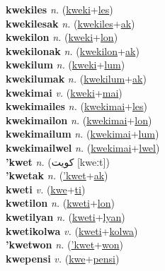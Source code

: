\textbf{kwekiles} \textit{n.} (\hyperref[kweki]{kweki}+\hyperref[les]{les})
 \label{kwekiles} \\
\textbf{kwekilesak} \textit{n.} (\hyperref[kwekiles]{kwekiles}+\hyperref[ak]{ak})
 \label{kwekilesak} \\
\textbf{kwekilon} \textit{n.} (\hyperref[kweki]{kweki}+\hyperref[lon]{lon})
 \label{kwekilon} \\
\textbf{kwekilonak} \textit{n.} (\hyperref[kwekilon]{kwekilon}+\hyperref[ak]{ak})
 \label{kwekilonak} \\
\textbf{kwekilum} \textit{n.} (\hyperref[kweki]{kweki}+\hyperref[lum]{lum})
 \label{kwekilum} \\
\textbf{kwekilumak} \textit{n.} (\hyperref[kwekilum]{kwekilum}+\hyperref[ak]{ak})
 \label{kwekilumak} \\
\textbf{kwekimai} \textit{v.} (\hyperref[kweki]{kweki}+\hyperref[mai]{mai})
 \label{kwekimai} \\
\textbf{kwekimailes} \textit{n.} (\hyperref[kwekimai]{kwekimai}+\hyperref[les]{les})
 \label{kwekimailes} \\
\textbf{kwekimailon} \textit{n.} (\hyperref[kwekimai]{kwekimai}+\hyperref[lon]{lon})
 \label{kwekimailon} \\
\textbf{kwekimailum} \textit{n.} (\hyperref[kwekimai]{kwekimai}+\hyperref[lum]{lum})
 \label{kwekimailum} \\
\textbf{kwekimailwel} \textit{n.} (\hyperref[kwekimai]{kwekimai}+\hyperref[lwel]{lwel})
 \label{kwekimailwel} \\
\textbf{'kwet} \textit{n.} ({\arabics{}كويت} [kweːt])
 \label{'kwet} \\
\textbf{'kwetak} \textit{n.} (\hyperref['kwet]{'kwet}+\hyperref[ak]{ak})
 \label{'kwetak} \\
\textbf{kweti} \textit{v.} (\hyperref[kwe]{kwe}+\hyperref[ti]{ti})
 \label{kweti} \\
\textbf{kwetilon} \textit{n.} (\hyperref[kweti]{kweti}+\hyperref[lon]{lon})
 \label{kwetilon} \\
\textbf{kwetilyan} \textit{n.} (\hyperref[kweti]{kweti}+\hyperref[lyan]{lyan})
 \label{kwetilyan} \\
\textbf{kwetikolwa} \textit{v.} (\hyperref[kweti]{kweti}+\hyperref[kolwa]{kolwa})
 \label{kwetikolwa} \\
\textbf{'kwetwon} \textit{n.} (\hyperref['kwet]{'kwet}+\hyperref[won]{won})
 \label{'kwetwon} \\
\textbf{kwepensi} \textit{v.} (\hyperref[kwe]{kwe}+\hyperref[pensi]{pensi})
 \label{kwepensi} \\
